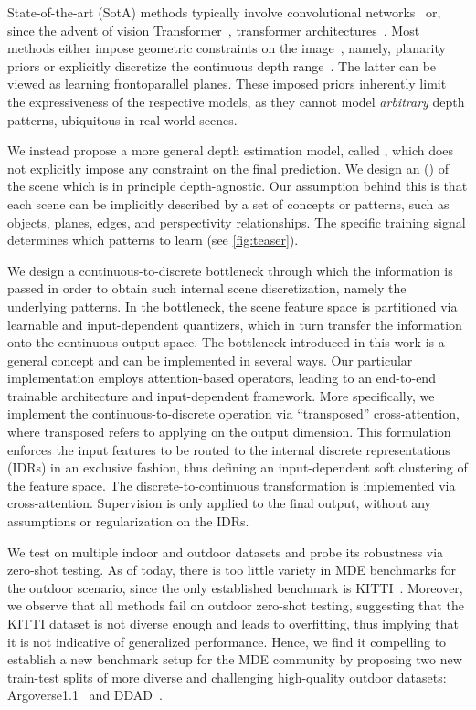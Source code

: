 State-of-the-art (SotA) methods typically involve convolutional networks~\cite{Eigen2014, Fu2018, Lee2019} or, since the advent of vision Transformer~\cite{Dosovitskiy2020VIT}, transformer architectures~\cite{Bhat2020, Yang2021, Ranftl2021, Yuan2022}. Most methods either impose geometric constraints on the image~\cite{Yin2019, Huynh2020, Long2021, Patil2022}, namely, planarity priors or explicitly discretize the continuous depth range~\cite{Fu2018, Bhat2020, Bhat2022}. The latter can be viewed as learning frontoparallel planes. These imposed priors inherently limit the expressiveness of the respective models, as they cannot model \emph{arbitrary} depth patterns, ubiquitous in real-world scenes.

We instead propose a more general depth estimation model, called \ourmodel, which does not explicitly impose any constraint on the final prediction. We design an \ourmodulename(\ourmodule) of the scene which is in principle depth-agnostic. Our assumption behind this \ourmodule is that each scene can be implicitly described by a set of concepts or patterns, such as objects, planes, edges, and perspectivity relationships. The specific training signal determines which patterns to learn (see \cref{fig:teaser}). 

We design a continuous-to-discrete bottleneck through which the information is passed in order to obtain such internal scene discretization, namely the underlying patterns. In the bottleneck, the scene feature space is partitioned via learnable and input-dependent quantizers, which in turn transfer the information onto the continuous output space. The \ourmodule bottleneck introduced in this work is a general concept and can be implemented in several ways. Our particular \ourmodule implementation employs attention-based operators, leading to an end-to-end trainable architecture and input-dependent framework. More specifically, we implement the continuous-to-discrete operation via ``transposed'' cross-attention, where transposed refers to applying  on the output dimension. This  formulation enforces the input features to be routed to the internal discrete representations (IDRs) in an exclusive fashion, thus defining an input-dependent soft clustering of the feature space. The discrete-to-continuous transformation is implemented via cross-attention. Supervision is only applied to the final output, without any assumptions or regularization on the IDRs. 

We test \ourmodel on multiple indoor and outdoor datasets and probe its robustness via zero-shot testing. As of today, there is too little variety in MDE benchmarks for the outdoor scenario, since the only established benchmark is KITTI~\cite{Geiger2012}. Moreover, we observe that all methods fail on outdoor zero-shot testing, suggesting that the KITTI dataset is not diverse enough and leads to overfitting, thus implying that it is not indicative of generalized performance. Hence, we find it compelling to establish a new benchmark setup for the MDE community by proposing two new train-test splits of more diverse and challenging high-quality outdoor datasets: Argoverse1.1~\cite{Chang2019} and DDAD~\cite{Guizilini2020}. 

